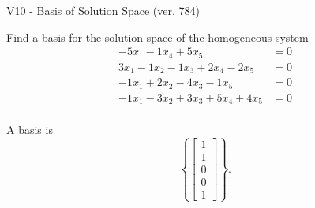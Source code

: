\begin{exercise}
  \begin{exerciseTitle}V10 - Basis of Solution Space (ver. 784)\end{exerciseTitle}
  \begin{exerciseStatement}
    Find a basis for the solution space of the homogeneous system 
\begin{align*}
 -5 x_ 1 -1 x_ 4 + 5 x_ 5 &= 0  \\ 
  3 x_ 1 -1 x_ 2 -1 x_ 3 + 2 x_ 4 -2 x_ 5 &= 0  \\ 
  -1 x_ 1 + 2 x_ 2 -4 x_ 3 -1 x_ 5 &= 0  \\ 
  -1 x_ 1 -3 x_ 2 + 3 x_ 3 + 5 x_ 4 + 4 x_ 5 &= 0  \\ 
 \end{align*}


 
  \end{exerciseStatement}

  \begin{exerciseAnswer}
   A basis is   
\[\left\{\left[\begin{array}{c}
1 \\
1 \\
0 \\
0 \\
1
\end{array}\right]\right\}.\]

  


  \end{exerciseAnswer}
\end{exercise}